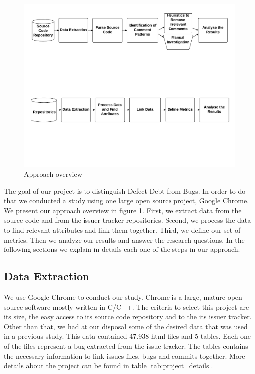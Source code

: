\begin{figure}[thb!]
  \caption{Approach overview}
  \centering
  \label{fig:approach}
  \includegraphics[width=1\textwidth]{figures/approach}
\end{figure}

The goal of our project is to distinguish Defect Debt from Bugs. In order to do that we conducted a study using one large open source project, Google Chrome. We present our approach overview in figure \ref{fig:approach}. First, we extract data from the source code and from the issuer tracker repositories. Second,  we process the data to find relevant attributes and link them together. Third, we define our set of metrics. Then we analyze our results and answer the research questions. In the following sections we explain in details each one of the steps in our approach.   

\subsection{Data Extraction}

We use Google Chrome to conduct our study. Chrome is a large, mature open source software mostly written in C/C++. The criteria to select this project are its size,  the easy access to its source code repository and to the its issuer tracker. Other than that, we had at our disposal some of the desired data that was used in a previous study.  This data contained 47.938 html files and 5 tables. Each one of the files represent a bug extracted from the issue tracker. The tables contains the necessary information to link issues files, bugs and commits together. More details about the project can be found in table \ref{tab:project_details}.

